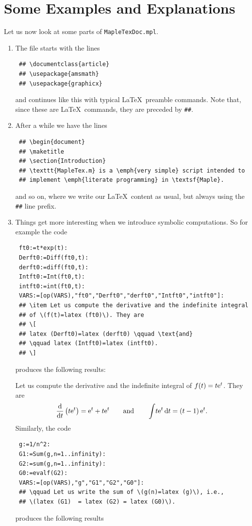 \documentclass{article}
\begin{document}
 \section{Some Examples and Explanations}
 Let us now look at some parts of \texttt{MapleTexDoc.mpl}.
 \begin{enumerate}
 \item The file  starts with the lines 
 \begin{lstlisting}
 ## \documentclass{article}
 ## \usepackage{amsmath}
 ## \usepackage{graphicx}
 \end{lstlisting}
 and continues like this with typical \LaTeX\ preamble commands. Note that, since these are 
 \LaTeX\ commands, they are preceded by \texttt{\#\#}.
 \item After a while we have  the lines 
 \begin{lstlisting}
 ## \begin{document}
 ## \maketitle
 ## \section{Introduction}
 ## \texttt{MapleTex.m} is a \emph{very simple} script intended to 
 ## implement \emph{literate programming} in \textsf{Maple}. 
 \end{lstlisting}
 and so on, where we write our \LaTeX\ content as usual, but always using the \texttt{\#\#} line prefix.
 \item Things get more interesting when we introduce symbolic computations. So for example the code 
 \begin{lstlisting}
 ft0:=t*exp(t):
 Derft0:=Diff(ft0,t):
 derft0:=diff(ft0,t):
 Intft0:=Int(ft0,t):
 intft0:=int(ft0,t):
 VARS:=[op(VARS),"ft0","Derft0","derft0","Intft0","intft0"]:
 ## \item Let us compute the derivative and the indefinite integral 
 ## of \(f(t)=latex (ft0)\). They are
 ## \[
 ## latex (Derft0)=latex (derft0) \qquad \text{and} 
 ## \qquad latex (Intft0)=latex (intft0). 
 ## \]
 \end{lstlisting}
 produces the following results:

 \qquad Let us compute the derivative and the indefinite integral 
 of \(f(t)=t{{\rm e}^{t}}\). They are
 \[
 {\frac {\rm d}{{\rm d}t}} \left( t{{\rm e}^{t}} \right) ={{\rm e}^{t}}+t{{\rm e}^{t}} \qquad \text{and} \qquad \int \!t{{\rm e}^{t}}\,{\rm d}t= \left( t-1 \right) {{\rm e}^{t}}. 
 \]
 Similarly,  the code
 \begin{lstlisting}
 g:=1/n^2:
 G1:=Sum(g,n=1..infinity):
 G2:=sum(g,n=1..infinity):
 G0:=evalf(G2):
 VARS:=[op(VARS),"g","G1","G2","G0"]:
 ## \qquad Let us write the sum of \(g(n)=latex (g)\), i.e., 
 ## \(latex (G1)  = latex (G2) = latex (G0)\).
 \end{lstlisting}
 produces the following results


\end{enumerate}
\end{document}
